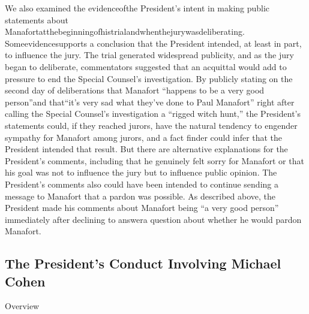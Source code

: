 We also examined the evidenceofthe President's intent in making public statements about Manafortatthebeginningofhistrialandwhenthejurywasdeliberating. Someevidencesupports a conclusion that the President intended, at least in part, to influence the jury. The trial generated widespread publicity, and as the jury began to deliberate, commentators suggested that an acquittal would add to pressure to end the Special Counsel's investigation. By publicly stating on the second day of deliberations that Manafort “happens to be a very good person”and that“it's very sad what they've done to Paul Manafort” right after calling the Special Counsel's investigation a “rigged witch hunt,” the President's statements could, if they reached jurors, have the natural tendency to engender sympathy for Manafort among jurors, and a fact finder could infer that the President intended that result. But there are alternative explanations for the President's comments, including that he genuinely felt sorry for Manafort or that his goal was not to influence the jury but to influence public opinion. The President's comments also could have been intended to continue sending a message to Manafort that a pardon was possible. As described above, the President made his comments about Manafort being “a very good person” immediately after declining to answera question about whether he would pardon Manafort.


\subsection{The President's Conduct Involving Michael Cohen}

Overview

